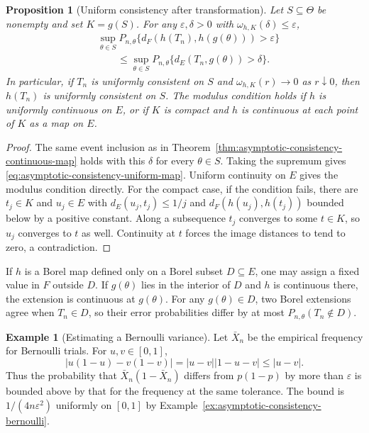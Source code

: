 \documentclass[11pt,oneside]{book}
\newtheorem{proposition}[theorem]{Proposition}
\theoremstyle{definition}
\newtheorem{example}[theorem]{Example}
\theoremstyle{remark}
\begin{document}
\begin{proposition}[Uniform consistency after transformation]
\label{prop:asymptotic-consistency-uniform-map}
Let $S\subseteq\Theta$ be nonempty and set $K=g(S)$.
For any $\varepsilon,\delta>0$ with
$\omega_{h,K}(\delta)\leq\varepsilon$,
\begin{equation}
\begin{split}
&\sup_{\theta\in S}P_{n,\theta}\{d_F(h(T_n),h(g(\theta)))>\varepsilon\}\\
&\qquad\leq \sup_{\theta\in S}P_{n,\theta}\{d_E(T_n,g(\theta))>\delta\}.
\end{split}
\label{eq:asymptotic-consistency-uniform-map}
\end{equation}
In particular, if $T_n$ is uniformly consistent on $S$ and
$\omega_{h,K}(r)\to0$ as $r\downarrow0$, then $h(T_n)$ is
uniformly consistent on $S$. The modulus condition holds
if $h$ is uniformly continuous on $E$, or if $K$ is compact
and $h$ is continuous at each point of $K$ as a map on $E$.
\end{proposition}
\begin{proof}
The same event inclusion as in
Theorem~\ref{thm:asymptotic-consistency-continuous-map} holds
with this $\delta$ for every $\theta\in S$. Taking the
supremum gives \eqref{eq:asymptotic-consistency-uniform-map}.
Uniform continuity on $E$ gives the modulus condition
directly. For the compact case, if the condition fails, there
are $t_j\in K$ and $u_j\in E$ with $d_E(u_j,t_j)\leq1/j$ and
$d_F(h(u_j),h(t_j))$ bounded below by a positive constant.
Along a subsequence $t_j$ converges to some $t\in K$, so
$u_j$ converges to $t$ as well. Continuity at $t$ forces the
image distances to tend to zero, a contradiction.
\end{proof}

If $h$ is a Borel map defined only on a Borel subset $D\subseteq E$,
one may assign a fixed value in $F$ outside $D$. If $g(\theta)$ lies
in the interior of $D$ and $h$ is continuous there, the extension
is continuous at $g(\theta)$. For any $g(\theta)\in D$, two Borel
extensions agree when $T_n\in D$, so their error probabilities
differ by at most $P_{n,\theta}(T_n\notin D)$.

\begin{example}[Estimating a Bernoulli variance]
\label{ex:asymptotic-transform-bernoulli-variance}
Let $\bar X_n$ be the empirical frequency for Bernoulli trials.
For $u,v\in[0,1]$,
\[
|u(1-u)-v(1-v)|=|u-v||1-u-v|\leq |u-v|.
\]
Thus the probability that $\bar X_n(1-\bar X_n)$ differs from
$p(1-p)$ by more than $\varepsilon$ is bounded above by that
for the frequency at the same tolerance. The bound is
$1/(4n\varepsilon^2)$ uniformly on $[0,1]$ by
Example~\ref{ex:asymptotic-consistency-bernoulli}.
\end{example}
\end{document}
